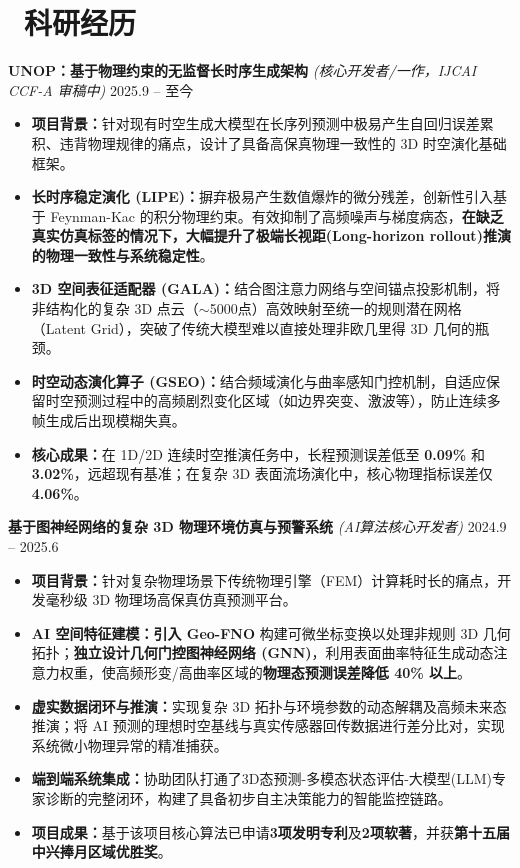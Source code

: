 \documentclass[11pt]{article}
\newlength{\interProjectSpacing}
\newcommand{\projectsep}{\vspace{\interProjectSpacing}}
\begin{document}
\section{\makebox[\widthof{\faUsers}][c]{\color{CVBlue}\faUsers}\ 科研经历}

\textbf{UNOP：基于物理约束的无监督长时序生成架构} \textit{(核心开发者/一作，IJCAI CCF-A 审稿中)} \hfill 2025.9 -- 至今
\begin{itemize}
    \item \textbf{项目背景：}针对现有时空生成大模型在长序列预测中极易产生自回归误差累积、违背物理规律的痛点，设计了具备高保真物理一致性的 3D 时空演化基础框架。
    \item \textbf{长时序稳定演化 (LIPE)：}摒弃极易产生数值爆炸的微分残差，创新性引入基于 Feynman-Kac 的积分物理约束。有效抑制了高频噪声与梯度病态，\textbf{在缺乏真实仿真标签的情况下，大幅提升了极端长视距(Long-horizon rollout)推演的物理一致性与系统稳定性}。
    \item \textbf{3D 空间表征适配器 (GALA)：}结合图注意力网络与空间锚点投影机制，将非结构化的复杂 3D 点云（$\sim$5000点）高效映射至统一的规则潜在网格（Latent Grid），突破了传统大模型难以直接处理非欧几里得 3D 几何的瓶颈。
    \item \textbf{时空动态演化算子 (GSEO)：}结合频域演化与曲率感知门控机制，自适应保留时空预测过程中的高频剧烈变化区域（如边界突变、激波等），防止连续多帧生成后出现模糊失真。
    \item \textbf{核心成果：}在 1D/2D 连续时空推演任务中，长程预测误差低至 \textbf{0.09\%} 和 \textbf{3.02\%}，远超现有基准；在复杂 3D 表面流场演化中，核心物理指标误差仅 \textbf{4.06\%}。
\end{itemize}

\projectsep

\textbf{基于图神经网络的复杂 3D 物理环境仿真与预警系统} \textit{(AI算法核心开发者)} \hfill 2024.9 -- 2025.6
\begin{itemize}
    \item \textbf{项目背景：}针对复杂物理场景下传统物理引擎（FEM）计算耗时长的痛点，开发毫秒级 3D 物理场高保真仿真预测平台。
    \item \textbf{AI 空间特征建模：}\textbf{引入 Geo-FNO} 构建可微坐标变换以处理非规则 3D 几何拓扑；\textbf{独立设计几何门控图神经网络 (GNN)}，利用表面曲率特征生成动态注意力权重，使高频形变/高曲率区域的\textbf{物理态预测误差降低 40\% 以上}。
    \item \textbf{虚实数据闭环与推演：}实现复杂 3D 拓扑与环境参数的动态解耦及高频未来态推演；将 AI 预测的理想时空基线与真实传感器回传数据进行差分比对，实现系统微小物理异常的精准捕获。
    \item \textbf{端到端系统集成：}协助团队打通了3D态预测-多模态状态评估-大模型(LLM)专家诊断的完整闭环，构建了具备初步自主决策能力的智能监控链路。
    \item \textbf{项目成果：}基于该项目核心算法已申请\textbf{3项发明专利}及\textbf{2项软著}，并获\textbf{第十五届中兴捧月区域优胜奖}。
\end{itemize}
\end{document}

